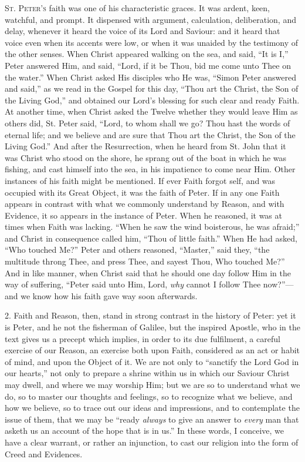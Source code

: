 S\textsc{t}. P\textsc{eter's} faith was one of his characteristic graces. It was
ardent, keen, watchful, and prompt. It dispensed with argument,
calculation, deliberation, and delay, whenever it heard the voice of
its Lord and Saviour: and it heard that voice even when its accents
were low, or when it was unaided by the testimony of the other senses.
When Christ appeared walking on the sea, and said, ``It is
I,'' Peter answered Him, and said, ``Lord, if it be Thou, bid
me come unto Thee on the water.'' When Christ asked His disciples
who He was, ``Simon Peter answered and said,'' as we read in
the Gospel for this day, ``Thou art the Christ, the Son of the
Living God,'' and obtained our Lord's blessing for such clear and
ready Faith. At another time, when Christ asked the Twelve whether
they would leave Him as others did, St. Peter said, ``Lord, to
whom shall we go? Thou hast the words of eternal life; and we believe
and are sure that Thou art the Christ, the Son of the Living
God.'' And after the Resurrection, when he heard from St. John
that it was Christ who stood on the shore, he sprang out of the boat
in which he was fishing, and cast himself into the sea, in his
impatience to come near Him. Other instances of his faith might be
mentioned. If ever Faith forgot self, and was occupied with its Great
Object, it was the faith of Peter. If in any one Faith appears in
contrast with what we commonly understand by Reason, and with
Evidence, it so appears in the instance of Peter. When he reasoned, it
was at times when Faith was lacking. ``When he saw the wind
boisterous, he was afraid;'' and Christ in consequence called him,
``Thou of little faith.'' When He had asked, ``Who touched
Me?'' Peter and others reasoned, ``Master,'' said they,
``the multitude throng Thee, and press Thee, and sayest Thou, Who
touched Me?'' And in like manner, when Christ said that he should
one day follow Him in the way of suffering, ``Peter said unto Him,
Lord, \emph{why} cannot I follow Thee now?''—and we know how his
faith gave way soon afterwards.

2. Faith and Reason, then, stand in strong contrast in the history
of Peter: yet it is Peter, and he not the fisherman of Galilee, but
the inspired Apostle, who in the text gives us a precept which
implies, in order to its due fulfilment, a careful exercise of our
Reason, an exercise both upon Faith, considered as an act or habit of
mind, and upon the Object of it. We are not only to ``sanctify the
Lord God in our hearts,'' not only to prepare a shrine within us
in which our Saviour Christ may dwell, and where we may worship Him;
but we are so to understand what we do, so to master our thoughts and
feelings, so to recognize what we believe, and how we believe, so to
trace out our ideas and impressions, and to contemplate the issue of
them, that we may be ``ready \emph{always} to give an answer to \emph{every}
man that asketh us an account of the hope that is in us.'' In
these words, I conceive, we have a clear warrant, or rather an
injunction, to cast our religion into the form of Creed and Evidences.

